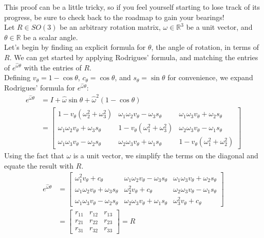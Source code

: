 \documentclass[oneside]{book}
\begin{document}
This proof can be a little tricky, so if you feel yourself starting to lose track of its progress, be sure to check back to the roadmap to gain your bearings!\\
Let $R\in SO(3)$ be an arbitrary rotation matrix, $\omega\in \mathbb{R}^3$ be a unit vector, and $\theta \in \mathbb{R}$ be a scalar angle.\\
Let's begin by finding an explicit formula for $\theta$, the angle of rotation, in terms of $R$. We can get started by applying Rodrigues' formula, and matching the entries of $e^{\hat\omega\theta}$ with the entries of $R$.\\
Defining $v_\theta = 1-\cos\theta$, $c_\theta = \cos\theta$, and $s_\theta = \sin\theta$ for convenience, we expand Rodrigues' formula for $e^{\hat\omega\theta}$:
\begin{align}
    e^{\hat\omega\theta} &= I + \hat\omega\sin\theta + \hat\omega^2(1-\cos\theta)\\
    &=
    \begin{bmatrix}
    1 - v_\theta(\omega_2^2+\omega_3^2) & \omega_1\omega_2v_\theta-\omega_3s_\theta & \omega_1\omega_3v_\theta+\omega_2s_\theta\\
    \omega_1\omega_2v_\theta+\omega_3s_\theta & 1-v_\theta(\omega_1^2+\omega_3^2) & \omega_2\omega_3v_\theta-\omega_1s_\theta\\
    \omega_1\omega_3v_\theta-\omega_2s_\theta & \omega_2\omega_3v_\theta+\omega_1s_\theta & 1-v_\theta(\omega_1^2+\omega_2^2)
    \end{bmatrix}
\end{align}
Using the fact that $\omega$ is a unit vector, we simplify the terms on the diagonal and equate the result with $R$.
\begin{align}
    e^{\hat\omega\theta} &= 
    \begin{bmatrix}
    \omega_1^2v_\theta + c_\theta & \omega_1\omega_2v_\theta-\omega_3s_\theta & \omega_1\omega_3v_\theta+\omega_2s_\theta\\
    \omega_1\omega_2v_\theta+\omega_3s_\theta & \omega_2^2v_\theta+c_\theta & \omega_2\omega_3v_\theta-\omega_1s_\theta\\
    \omega_1\omega_3v_\theta-\omega_2s_\theta & \omega_2\omega_3v_\theta+\omega_1s_\theta & \omega_3^2v_\theta+c_\theta
    \end{bmatrix}\\
    &= \begin{bmatrix}
    r_{11} & r_{12} & r_{13}\\
    r_{21} & r_{22} & r_{23}\\
    r_{31} & r_{32} & r_{33}
    \end{bmatrix} = R
\end{align}
\end{document}
